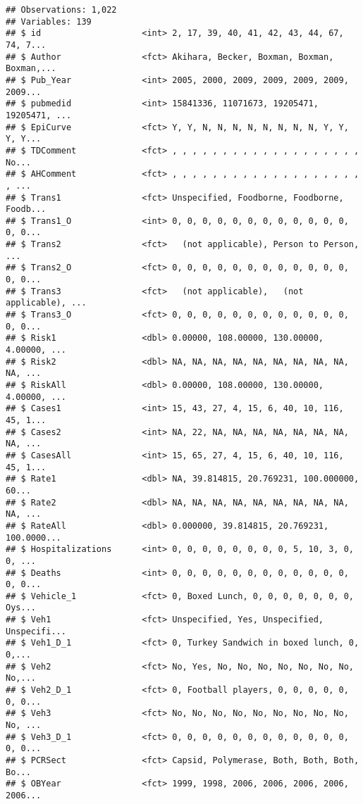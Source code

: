 \documentclass[]{article}
\begin{document}
\begin{verbatim}
## Observations: 1,022
## Variables: 139
## $ id                    <int> 2, 17, 39, 40, 41, 42, 43, 44, 67, 74, 7...
## $ Author                <fct> Akihara, Becker, Boxman, Boxman, Boxman,...
## $ Pub_Year              <int> 2005, 2000, 2009, 2009, 2009, 2009, 2009...
## $ pubmedid              <int> 15841336, 11071673, 19205471, 19205471, ...
## $ EpiCurve              <fct> Y, Y, N, N, N, N, N, N, N, N, Y, Y, Y, Y...
## $ TDComment             <fct> , , , , , , , , , , , , , , , , , , , No...
## $ AHComment             <fct> , , , , , , , , , , , , , , , , , , , , ...
## $ Trans1                <fct> Unspecified, Foodborne, Foodborne, Foodb...
## $ Trans1_O              <int> 0, 0, 0, 0, 0, 0, 0, 0, 0, 0, 0, 0, 0, 0...
## $ Trans2                <fct>   (not applicable), Person to Person,   ...
## $ Trans2_O              <fct> 0, 0, 0, 0, 0, 0, 0, 0, 0, 0, 0, 0, 0, 0...
## $ Trans3                <fct>   (not applicable),   (not applicable), ...
## $ Trans3_O              <fct> 0, 0, 0, 0, 0, 0, 0, 0, 0, 0, 0, 0, 0, 0...
## $ Risk1                 <dbl> 0.00000, 108.00000, 130.00000, 4.00000, ...
## $ Risk2                 <dbl> NA, NA, NA, NA, NA, NA, NA, NA, NA, NA, ...
## $ RiskAll               <dbl> 0.00000, 108.00000, 130.00000, 4.00000, ...
## $ Cases1                <int> 15, 43, 27, 4, 15, 6, 40, 10, 116, 45, 1...
## $ Cases2                <int> NA, 22, NA, NA, NA, NA, NA, NA, NA, NA, ...
## $ CasesAll              <int> 15, 65, 27, 4, 15, 6, 40, 10, 116, 45, 1...
## $ Rate1                 <dbl> NA, 39.814815, 20.769231, 100.000000, 60...
## $ Rate2                 <dbl> NA, NA, NA, NA, NA, NA, NA, NA, NA, NA, ...
## $ RateAll               <dbl> 0.000000, 39.814815, 20.769231, 100.0000...
## $ Hospitalizations      <int> 0, 0, 0, 0, 0, 0, 0, 0, 5, 10, 3, 0, 0, ...
## $ Deaths                <int> 0, 0, 0, 0, 0, 0, 0, 0, 0, 0, 0, 0, 0, 0...
## $ Vehicle_1             <fct> 0, Boxed Lunch, 0, 0, 0, 0, 0, 0, 0, Oys...
## $ Veh1                  <fct> Unspecified, Yes, Unspecified, Unspecifi...
## $ Veh1_D_1              <fct> 0, Turkey Sandwich in boxed lunch, 0, 0,...
## $ Veh2                  <fct> No, Yes, No, No, No, No, No, No, No, No,...
## $ Veh2_D_1              <fct> 0, Football players, 0, 0, 0, 0, 0, 0, 0...
## $ Veh3                  <fct> No, No, No, No, No, No, No, No, No, No, ...
## $ Veh3_D_1              <fct> 0, 0, 0, 0, 0, 0, 0, 0, 0, 0, 0, 0, 0, 0...
## $ PCRSect               <fct> Capsid, Polymerase, Both, Both, Both, Bo...
## $ OBYear                <fct> 1999, 1998, 2006, 2006, 2006, 2006, 2006...

\end{verbatim}
\end{document}
